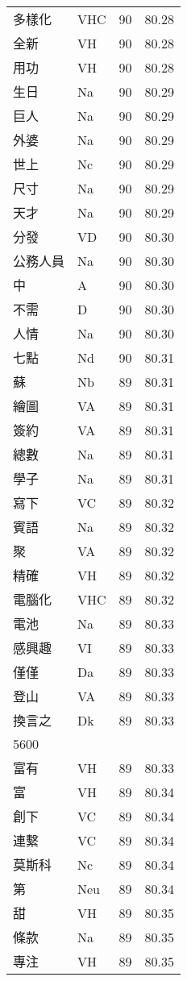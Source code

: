 \documentclass[twocolumn]{book}
\begin{document}
\begin{supertabular}{llrr}
多樣化 & VHC & 90 &  80.28\\
全新 & VH & 90 &  80.28\\
用功 & VH & 90 &  80.28\\
生日 & Na & 90 &  80.29\\
巨人 & Na & 90 &  80.29\\
外婆 & Na & 90 &  80.29\\
世上 & Nc & 90 &  80.29\\
尺寸 & Na & 90 &  80.29\\
天才 & Na & 90 &  80.29\\
分發 & VD & 90 &  80.30\\
公務人員 & Na & 90 &  80.30\\
中 & A & 90 &  80.30\\
不需 & D & 90 &  80.30\\
人情 & Na & 90 &  80.30\\
七點 & Nd & 90 &  80.31\\
蘇 & Nb & 89 &  80.31\\
繪圖 & VA & 89 &  80.31\\
簽約 & VA & 89 &  80.31\\
總數 & Na & 89 &  80.31\\
學子 & Na & 89 &  80.31\\
寫下 & VC & 89 &  80.32\\
賓語 & Na & 89 &  80.32\\
聚 & VA & 89 &  80.32\\
精確 & VH & 89 &  80.32\\
電腦化 & VHC & 89 &  80.32\\
電池 & Na & 89 &  80.33\\
感興趣 & VI & 89 &  80.33\\
僅僅 & Da & 89 &  80.33\\
登山 & VA & 89 &  80.33\\
換言之 & Dk & 89 &  80.33\\
5600\\
富有 & VH & 89 &  80.33\\
富 & VH & 89 &  80.34\\
創下 & VC & 89 &  80.34\\
連繫 & VC & 89 &  80.34\\
莫斯科 & Nc & 89 &  80.34\\
第 & Neu & 89 &  80.34\\
甜 & VH & 89 &  80.35\\
條款 & Na & 89 &  80.35\\
專注 & VH & 89 &  80.35\\

\end{supertabular}
\end{document}
